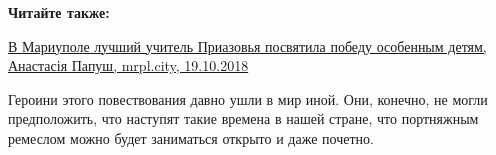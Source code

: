 \textbf{Читайте также:} 

\href{https://mrpl.city/news/view/v-mariupole-luchshij-uchitel-priazovya-posvyatila-pobedu-osobennym-detyam-foto}{В Мариуполе лучший учитель Приазовья посвятила победу особенным детям, Анастасія Папуш, mrpl.city, 19.10.2018}

Героини этого повествования давно ушли в мир иной. Они, конечно, не могли
предположить, что наступят такие времена в нашей стране, что портняжным
ремеслом можно будет заниматься открыто и даже почетно.
